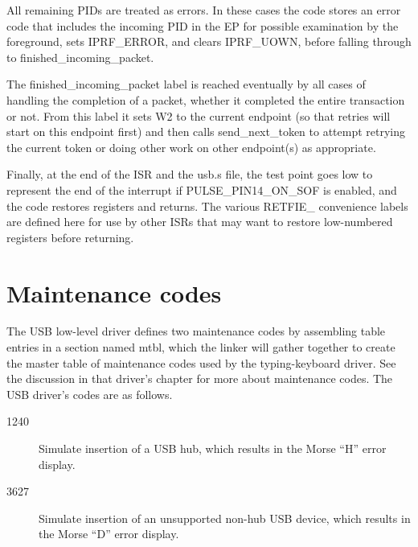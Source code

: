 All remaining PIDs are treated as errors.  In these cases the code stores
an error code that includes the incoming PID in the EP for possible
examination by the foreground, sets IPRF\_ERROR, and clears IPRF\_UOWN,
before falling through to finished\_incoming\_packet.

The finished\_incoming\_packet label is reached eventually by all cases of
handling the completion of a packet, whether it completed the entire
transaction or not.  From this label it sets W2 to the current endpoint (so
that retries will start on this endpoint first) and then calls
send\_next\_token to attempt retrying the current token or doing other work
on other endpoint(s) as appropriate.

Finally, at the end of the ISR and the usb.s file, the test point goes low
to represent the end of the interrupt if PULSE\_PIN14\_ON\_SOF is
enabled, and the code restores registers and returns.  The various RETFIE\_
convenience labels are defined here for use by other ISRs that may want to
restore low-numbered registers before returning.

\section{Maintenance codes}

The USB low-level driver defines two maintenance codes by assembling table
entries in a section named mtbl, which the linker will gather together to
create the master table of maintenance codes used by the typing-keyboard
driver.  See the discussion in that driver's chapter for more about
maintenance codes.  The USB driver's codes are as follows.

\begin{description}
  \item[1240] Simulate insertion of a USB hub, which results in the
  Morse ``H'' error display.
  \item[3627] Simulate insertion of an unsupported non-hub USB device, which
  results in the Morse ``D'' error display.
\end{description}

